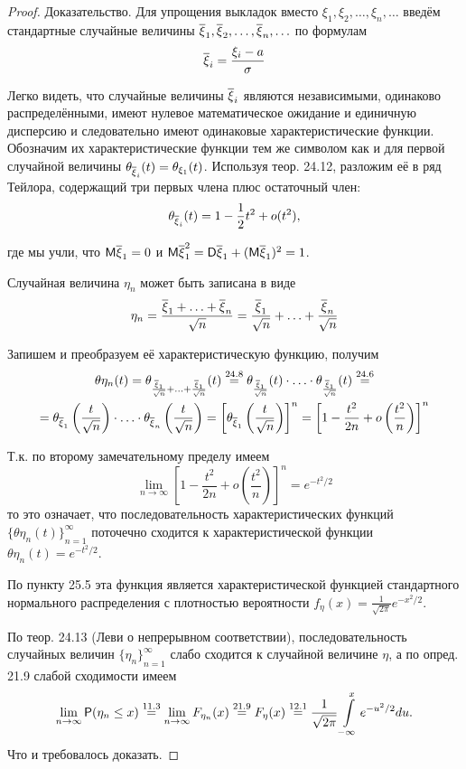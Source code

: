 \begin{proof}

Доказательство. Для упрощения выкладок вместо $\xi_1 , \xi_2 , \ldots , \xi_n , \ldots$
введём стандартные случайные величины $\oxi_1 , \oxi_2 , \ldots , \oxi_n , \ldots$ по формулам
$$
\oxi_i=\frac{\xi_i-a}{\sigma}
$$

Легко видеть, что случайные величины $\oxi_i$ являются независимыми, одинаково распределёнными, имеют нулевое математическое ожидание и единичную дисперсию и следовательно имеют одинаковые характеристические функции. Обозначим их характеристические функции тем же символом как и для первой случайной величины $\theta_{\oxi_i}(t) = \theta_{\xi_1} (t)$. Используя теор. 24.12, разложим её в ряд Тейлора, содержащий три первых члена плюс остаточный член:
$$
\theta_{\oxi_i}(t)=1-\frac{1}{2}t^2+o(t^2),
$$

где мы учли, что $\M\oxi_1 = 0$ и $\M\oxi_1^2 = \D\oxi_1 + (\M\oxi_1)^2 = 1$.

Случайная величина $\eta_n$ может быть записана в виде
$$\eta_n =\frac{\oxi_1+\ldots+\oxi_n}{\sqrt{n}}=
\frac{\oxi_1}{\sqrt{n}}+\ldots+\frac{\oxi_n}{\sqrt{n}}
$$

Запишем и преобразуем её характеристическую функцию, получим
\begin{gather*}
\theta\eta_n (t) = \theta_{\frac{\oxi_1}{\sqrt{n}} + \ldots + \frac{\oxi_1}{\sqrt{n}}}(t)
\stackrel{24.8}{=}
\theta_{\frac{\oxi_1}{\sqrt{n}}}(t)\cdot\ldots\cdot \theta_{\frac{\oxi_1}{\sqrt{n}}}(t)
\stackrel{24.6}{=}\\=
\theta_{\oxi_1}\left(\frac{t}{\sqrt{n}}\right)
	\cdot\ldots\cdot
\theta_{\oxi_n}\left(\frac{t}{\sqrt{n}}\right)=
\left[
	\theta_{\oxi_1}\left(\frac{t}{\sqrt{n}}\right)
\right]^n=
\left[
	1-\frac{t^2}{2n}+o\left(\frac{t^2}{n}\right)
\right]^n
\end{gather*}

Т.к. по второму замечательному пределу имеем
$$
\lim\limits_{n\to\infty}
\left[
	1-\frac{t^2}{2n}+o\left(\frac{t^2}{n}\right)
\right]^n=e^{-t^2/2}
$$
то это означает, что последовательность характеристических функций
${\{\theta\eta_n (t)\}}_{n=1}^\infty$ поточечно сходится к характеристической функции 
${\theta\eta_n (t)}=e^{-t^2/2}$.

По пункту 25.5 эта функция является характеристической функцией стандартного нормального распределения с плотностью вероятности
$f_\eta (x) = \frac{1}{\sqrt{2\pi}}e^{-x^2/2}$. 

По теор. 24.13 (Леви о непрерывном соответствии), последовательность случайных величин ${\{\eta_n \}}^\infty_{n=1}$ слабо сходится к случайной
величине $\eta$, а по опред. 21.9 слабой сходимости имеем
\begin{gather*}
\lim\limits_{n\to\infty} \P(\eta_n \leq x)
\stackrel{11.3}{=}
\lim\limits_{n\to\infty} F_{\eta_n}(x)
\stackrel{21.9}{=}
F_\eta(x)
\stackrel{12.1}{=}
\frac{1}{\sqrt{2\pi}}\int\limits_{-\infty}^x e^{-u^2/2} du.
\end{gather*}
Что и требовалось доказать.
\end{proof}

